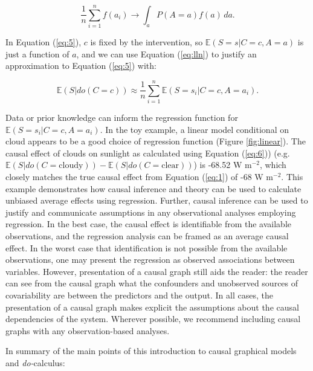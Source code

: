 \documentclass[12pt]{article}
\begin{document}
\begin{equation}
  \frac{1}{n} \sum_{i=1}^n f(a_i) \to \int_a P(A=a) f(a) \, d a.
  \label{eq:lln}
\end{equation}

In Equation (\ref{eq:5}), $c$ is fixed by the intervention, so
$\mathbb{E}(S=s | C=c, A=a)$ is just a function of $a$, and we can use
Equation (\ref{eq:lln}) to justify an approximation to Equation
(\ref{eq:5}) with:

\begin{equation}
  \mathbb{E}(S | do(C = c))  \approx \frac{1}{n} \sum_{i=1}^n \mathbb{E}(S=s_i |
  C=c, A=a_i).
  \label{eq:6}
\end{equation}

Data or prior knowledge can inform the regression function for
$\mathbb{E}(S=s_i | C=c, A=a_i)$. In the toy example, a linear model
conditional on cloud appears to be a good choice of regression
function (Figure \ref{fig:linear}). The causal effect of clouds on
sunlight as calculated using Equation (\ref{eq:6})) (e.g.
$\mathbb{E}(S | do(C = \text{cloudy})) - \mathbb{E}(S | do(C =
\text{clear}))$) is -68.52 W m$^{-2}$, which closely matches the true
causal effect from Equation (\ref{eq:1}) of -68 W m$^{-2}$. This
example demonstrates how causal inference and theory can be used to
calculate unbiased average effects using regression. Further, causal
inference can be used to justify and communicate assumptions in any
observational analyses employing regression. In the best case, the
causal effect is identifiable from the available observations, and the
regression analysis can be framed as an average causal effect. In the
worst case that identification is not possible from the available
observations, one may present the regression as observed associations
between variables. However, presentation of a causal graph still aids
the reader: the reader can see from the causal graph what the
confounders and unobserved sources of covariability are between the
predictors and the output. In all cases, the presentation of a causal
graph makes explicit the assumptions about the causal dependencies of
the system. Wherever possible, we recommend including causal graphs
with any observation-based analyses.

In summary of the main points of this introduction to causal graphical
models and \textit{do-}calculus:
\end{document}
